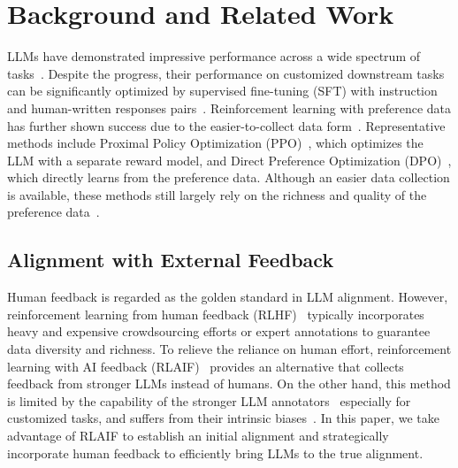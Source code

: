 \section{Background and Related Work}
LLMs have demonstrated impressive performance across a wide spectrum of tasks~\cite{achiam2023gpt, dubey2024llama, team2023gemini}. Despite the progress, their performance on customized downstream tasks can be significantly optimized by supervised fine-tuning (SFT) with instruction and human-written responses pairs~\cite{chung2024scaling, thoppilan2022lamda}. Reinforcement learning with preference data has further shown success due to the easier-to-collect data form~\cite{ouyang2022training, stiennon2020learning, lee2023rlaif}. Representative methods include Proximal Policy Optimization
(PPO)~\cite{schulman2017proximal}, which optimizes the LLM with a separate reward model, and Direct Preference Optimization (DPO)~\cite{rafailov2024direct}, which directly learns from the preference data. Although an easier data collection is available, these methods still largely rely on the richness and quality of the preference data~\cite{xu2024dpo,zheng2023secrets, wang2024secrets}.

\vspace{-0.1in}

\subsection{Alignment with External Feedback}
\vspace{-0.05in}
Human feedback is regarded as the golden standard in LLM alignment. However, reinforcement learning from human feedback (RLHF)~\cite{ouyang2022training, stiennon2020learning, kopf2024openassistant} typically incorporates heavy and expensive crowdsourcing efforts or expert annotations to guarantee data diversity and richness. To relieve the reliance on human effort, reinforcement learning with AI feedback (RLAIF)~\cite{lee2023rlaif, bai2022constitutional} provides an alternative that collects feedback from stronger LLMs instead of humans. On the other hand, this method is limited by the capability of the stronger LLM annotators~\cite{huang2024self, sharma2024critical, lee2023rlaif} especially for customized tasks, and suffers from their intrinsic biases~\cite{zheng2023judging}.
In this paper, we take advantage of RLAIF to establish an initial alignment and strategically incorporate human feedback to efficiently bring LLMs to the true alignment.
    
